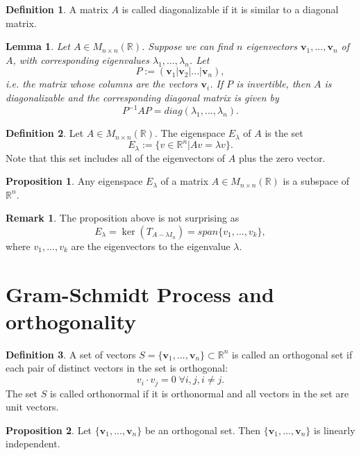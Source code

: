 \documentclass[11pt,a4paper]{article}
\newcommand\R{\mathbb{R}}
\newcommand\vb{\mathbf{v}}
\newcommand\inMatrixSq{\in M_{n \times n} (\R)}
\newtheorem{lemma}{Lemma}
\theoremstyle{definition}
\newtheorem{definition}{Definition}
\newtheorem{proposition}{Proposition}
\newtheorem{remark}{Remark}
\begin{document}
\begin{definition}
    A matrix $ A $ is called diagonalizable if it is similar to a diagonal matrix.
\end{definition}

\begin{lemma}
    Let $ A \inMatrixSq $. Suppose we can find $n$ eigenvectors $ \vb_1, ...,\vb_n $ of $ A $, with corresponding eigenvalues $\lambda_1, ..., \lambda_n$. Let
    \[ P := (\vb_1|\vb_2|...|\vb_n),\]
    i.e. the matrix whose columns are the vectors $ \vb_i $. If $ P $ is invertible, then $ A $ is diagonalizable and the corresponding diagonal matrix is given by 
    \[ P^{-1}AP = diag(\lambda_1, ..., \lambda_n).\]
\end{lemma}

\begin{definition}
    Let $ A \inMatrixSq $. The eigenspace $E_\lambda$ of $ A $ is the set
    \[ E_\lambda := \{ v \in \R^n | Av = \lambda v\}.\] 
    Note that this set includes all of the eigenvectors of $ A $ plus the zero vector.
\end{definition}

\begin{proposition}
    Any eigenspace $ E_\lambda $ of a matrix $ A \inMatrixSq $ is a subspace of $ \R^n $.
\end{proposition}

\begin{remark}
    The proposition above is not surprising as 
    \[ E_\lambda = \ker(T_{A - \lambda I_n}) = span\{v_1, ..., v_k\},\]
    where $ v_1, ..., v_k $ are the eigenvectors to the eigenvalue $\lambda$.

\end{remark}

\section{Gram-Schmidt Process and orthogonality}

\begin{definition}
    A set of vectors $ S = \{\vb_1,...,\vb_n\} \subset \R^n $ is called an orthogonal set if each pair of distinct vectors in the set is orthogonal:
    \[ v_i \cdot v_j = 0 \; \forall i, j, i\neq j.\]
    The set $ S $ is called orthonormal if it is orthonormal and all vectors in the set are unit vectors.
\end{definition}

\begin{proposition}
    Let $ \{\vb_1,...,\vb_n\} $ be an orthogonal set. Then $\{\vb_1,...,\vb_n\}$ is linearly independent.
\end{proposition}
\end{document}
